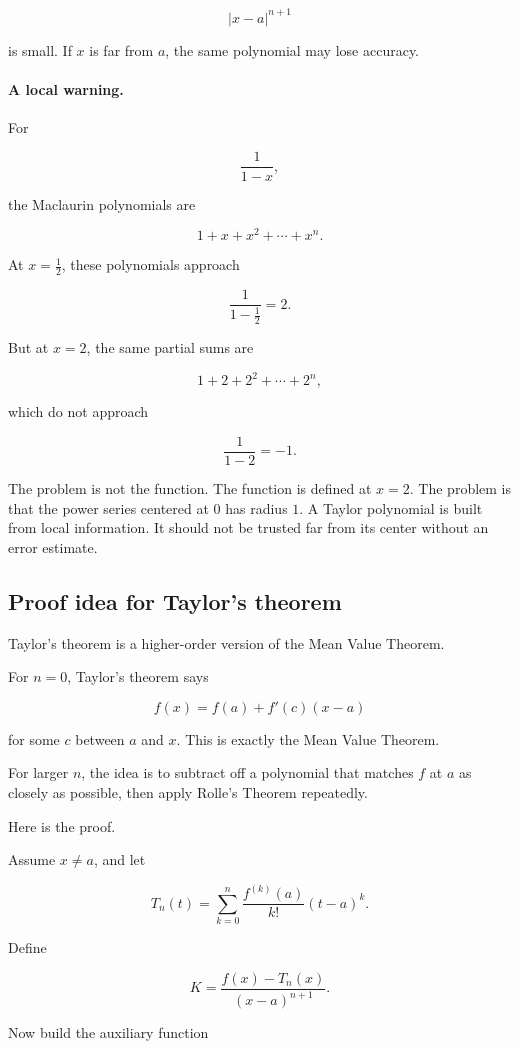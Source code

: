 \[
|x-a|^{n+1}
\]

is small.  If \(x\) is far from \(a\), the same polynomial may lose accuracy.

\paragraph{A local warning.}
For

\[
\frac1{1-x},
\]

the Maclaurin polynomials are

\[
1+x+x^2+\cdots+x^n.
\]

At \(x=\frac12\), these polynomials approach

\[
\frac1{1-\frac12}=2.
\]

But at \(x=2\), the same partial sums are

\[
1+2+2^2+\cdots+2^n,
\]

which do not approach

\[
\frac1{1-2}=-1.
\]

The problem is not the function.  The function is defined at \(x=2\).  The problem is
that the power series centered at \(0\) has radius \(1\).  A Taylor polynomial is built
from local information.  It should not be trusted far from its center without an error
estimate.

\subsection{Proof idea for Taylor's theorem}
\label{subsec:proof-idea-taylor-theorem}

Taylor's theorem is a higher-order version of the Mean Value Theorem.

For \(n=0\), Taylor's theorem says

\[
f(x)=f(a)+f'(c)(x-a)
\]

for some \(c\) between \(a\) and \(x\).  This is exactly the Mean Value Theorem.

For larger \(n\), the idea is to subtract off a polynomial that matches \(f\) at \(a\) as
closely as possible, then apply Rolle's Theorem repeatedly.

Here is the proof.

Assume \(x\neq a\), and let

\[
T_n(t)=
\sum_{k=0}^{n}
\frac{f^{(k)}(a)}{k!}(t-a)^k.
\]

Define

\[
K=\frac{f(x)-T_n(x)}{(x-a)^{n+1}}.
\]

Now build the auxiliary function


